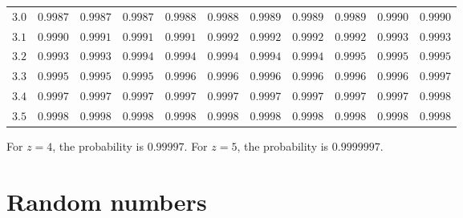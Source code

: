 \documentclass[
  11pt,
  a4paper,
  krantz2]{krantz}
\begin{document}
\begin{table}
\begin{tabular}{lrrrrrrrrrr}
\vspace{3pt}
$ 3.0 $ & $0.9987$ & $0.9987$ & $0.9987$ & $0.9988$ & $0.9988$ & $0.9989$ & $0.9989$ & $0.9989$ & $0.9990$ & $0.9990$\\
$ 3.1 $ & $0.9990$ & $0.9991$ & $0.9991$ & $0.9991$ & $0.9992$ & $0.9992$ & $0.9992$ & $0.9992$ & $0.9993$ & $0.9993$\\
$ 3.2 $ & $0.9993$ & $0.9993$ & $0.9994$ & $0.9994$ & $0.9994$ & $0.9994$ & $0.9994$ & $0.9995$ & $0.9995$ & $0.9995$\\
$ 3.3 $ & $0.9995$ & $0.9995$ & $0.9995$ & $0.9996$ & $0.9996$ & $0.9996$ & $0.9996$ & $0.9996$ & $0.9996$ & $0.9997$\\
$ 3.4 $ & $0.9997$ & $0.9997$ & $0.9997$ & $0.9997$ & $0.9997$ & $0.9997$ & $0.9997$ & $0.9997$ & $0.9997$ & $0.9998$\\
\vspace{3pt}
$ 3.5 $ & $0.9998$ & $0.9998$ & $0.9998$ & $0.9998$ & $0.9998$ & $0.9998$ & $0.9998$ & $0.9998$ & $0.9998$ & $0.9998$\\
\bottomrule
\end{tabular}
\endgroup{}
\end{table}

\begin{normalsize}
For $z = 4$, the probability is $0.99997$. 
For $z = 5$, the probability is $0.9999997$.
\end{normalsize}

\pagebreak

\section{Random numbers}\label{AppendixRandomNumbers}
\end{document}
